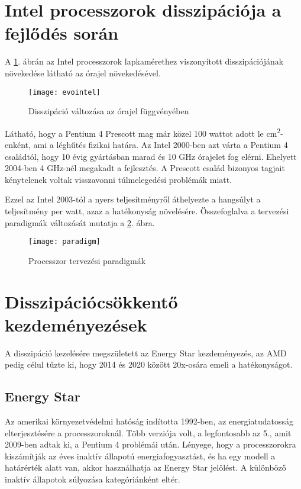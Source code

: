 \section{Intel processzorok disszipációja a fejlődés során}
A \ref{fig:evointel}. ábrán az Intel processzorok lapkamérethez viszonyított disszipációjának növekedése látható az órajel növekedésével.
\begin{figure}[H]
    \texttt{[image: evointel]}
    \centering
    \caption{Disszipáció változása az órajel függvényében}
    \label{fig:evointel}
\end{figure}
Látható, hogy a Pentium 4 Prescott mag már közel 100 wattot adott le cm\textsuperscript{2}-enként, ami a léghűtés fizikai határa.
Az Intel 2000-ben azt várta a Pentium 4 családtól, hogy 10 évig gyártásban marad és 10 GHz órajelet fog elérni.
Ehelyett 2004-ben 4 GHz-nél megakadt a fejlesztés.
A Prescott család bizonyos tagjait kénytelenek voltak visszavonni túlmelegedési problémák miatt.

Ezzel az Intel 2003-tól a nyers teljesítményről áthelyezte a hangsúlyt a teljesítmény per watt, azaz a hatékonyság növelésére.
Összefoglalva a tervezési paradigmák változását mutatja a \ref{fig:paradigm}. ábra.
\begin{figure}[H]
    \texttt{[image: paradigm]}
    \centering
    \caption{Processzor tervezési paradigmák}
    \label{fig:paradigm}
\end{figure}

\section{Disszipációcsökkentő kezdeményezések}
A disszipáció kezelésére megszületett az Energy Star kezdeményezés, az AMD pedig célul tűzte ki, hogy 2014 és 2020 között 20x-osára emeli a hatékonyságot.

\subsection{Energy Star}
Az amerikai környezetvédelmi hatóság indította 1992-ben, az energiatudatosság elterjesztésére a processzoroknál.
Több verziója volt, a legfontosabb az 5., amit 2009-ben adtak ki, a Pentium 4 problémái után.
Lényege, hogy a processzorokra kiszámítják az éves inaktív állapotú energiafogyasztást, és ha egy modell a határérték alatt van, akkor használhatja az Energy Star jelölést.
A különböző inaktív állapotok súlyozása kategóriánként eltér.


